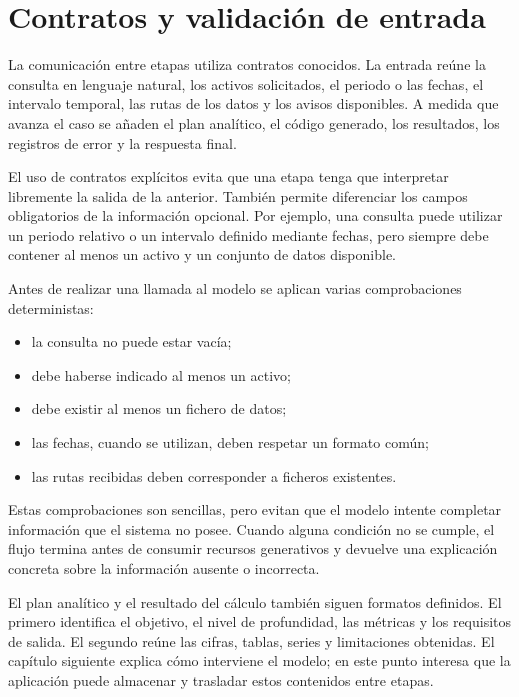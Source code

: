 \section{Contratos y validación de entrada}

La comunicación entre etapas utiliza contratos conocidos. La entrada reúne la consulta en lenguaje natural, los activos solicitados, el periodo o las fechas, el intervalo temporal, las rutas de los datos y los avisos disponibles. A medida que avanza el caso se añaden el plan analítico, el código generado, los resultados, los registros de error y la respuesta final.

El uso de contratos explícitos evita que una etapa tenga que interpretar libremente la salida de la anterior. También permite diferenciar los campos obligatorios de la información opcional. Por ejemplo, una consulta puede utilizar un periodo relativo o un intervalo definido mediante fechas, pero siempre debe contener al menos un activo y un conjunto de datos disponible.

Antes de realizar una llamada al modelo se aplican varias comprobaciones deterministas:

\begin{itemize}
    \item la consulta no puede estar vacía;
    \item debe haberse indicado al menos un activo;
    \item debe existir al menos un fichero de datos;
    \item las fechas, cuando se utilizan, deben respetar un formato común;
    \item las rutas recibidas deben corresponder a ficheros existentes.
\end{itemize}

Estas comprobaciones son sencillas, pero evitan que el modelo intente completar información que el sistema no posee. Cuando alguna condición no se cumple, el flujo termina antes de consumir recursos generativos y devuelve una explicación concreta sobre la información ausente o incorrecta.

El plan analítico y el resultado del cálculo también siguen formatos definidos. El primero identifica el objetivo, el nivel de profundidad, las métricas y los requisitos de salida. El segundo reúne las cifras, tablas, series y limitaciones obtenidas. El capítulo siguiente explica cómo interviene el modelo; en este punto interesa que la aplicación puede almacenar y trasladar estos contenidos entre etapas.

